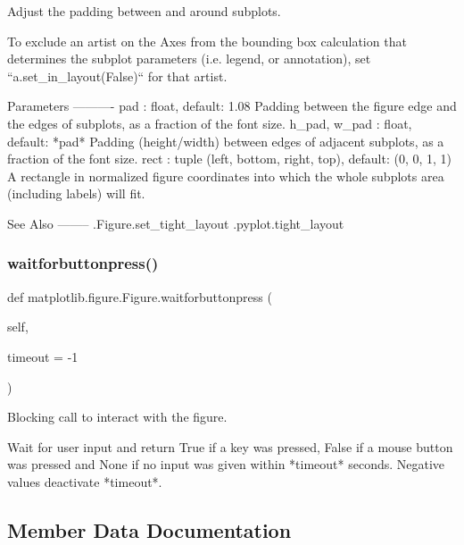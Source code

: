 \begin{DoxyVerb}Adjust the padding between and around subplots.

To exclude an artist on the Axes from the bounding box calculation
that determines the subplot parameters (i.e. legend, or annotation),
set ``a.set_in_layout(False)`` for that artist.

Parameters
----------
pad : float, default: 1.08
    Padding between the figure edge and the edges of subplots,
    as a fraction of the font size.
h_pad, w_pad : float, default: *pad*
    Padding (height/width) between edges of adjacent subplots,
    as a fraction of the font size.
rect : tuple (left, bottom, right, top), default: (0, 0, 1, 1)
    A rectangle in normalized figure coordinates into which the whole
    subplots area (including labels) will fit.

See Also
--------
.Figure.set_tight_layout
.pyplot.tight_layout
\end{DoxyVerb}
 \mbox{\label{classmatplotlib_1_1figure_1_1Figure_a7270364644a2289a1113aa6b61e23e7a}} 
\subsubsection{\texorpdfstring{waitforbuttonpress()}{waitforbuttonpress()}}
{\footnotesize\ttfamily def matplotlib.\+figure.\+Figure.\+waitforbuttonpress (\begin{DoxyParamCaption}\item[{}]{self,  }\item[{}]{timeout = {\ttfamily -\/1} }\end{DoxyParamCaption})}

\begin{DoxyVerb}Blocking call to interact with the figure.

Wait for user input and return True if a key was pressed, False if a
mouse button was pressed and None if no input was given within
*timeout* seconds.  Negative values deactivate *timeout*.
\end{DoxyVerb}
 

\subsection{Member Data Documentation}
\mbox{\label{classmatplotlib_1_1figure_1_1Figure_a5871b1c94eebc19ba5c02dfdae9f8b86}} 
